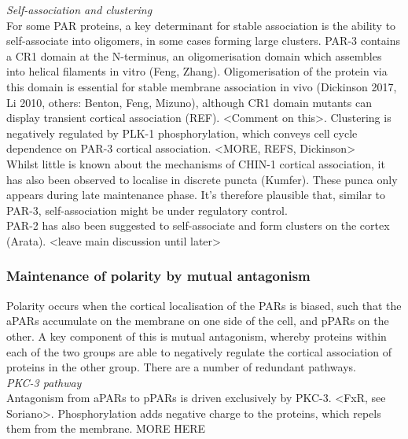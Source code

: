 \documentclass[12pt]{"article"}
\begin{document}
\textit{Self-association and clustering}\\

For some PAR proteins, a key determinant for stable association is the ability to self-associate into oligomers, in some cases forming large clusters. PAR-3 contains a CR1 domain at the N-terminus, an oligomerisation domain which assembles into helical filaments in vitro (Feng, Zhang). Oligomerisation of the protein via this domain is essential for stable membrane association in vivo (Dickinson 2017, Li 2010, others: Benton, Feng, Mizuno), although CR1 domain mutants can display transient cortical association (REF). <Comment on this>. Clustering is negatively regulated by PLK-1 phosphorylation, which conveys cell cycle dependence on PAR-3 cortical association. <MORE, REFS, Dickinson>\\

Whilst little is known about the mechanisms of CHIN-1 cortical association, it has also been observed to localise in discrete puncta (Kumfer). These punca only appears during late maintenance phase. It’s therefore plausible that, similar to PAR-3, self-association might be under regulatory control.\\

PAR-2 has also been suggested to self-associate and form clusters on the cortex (Arata). <leave main discussion until later>\\


\subsubsection{Maintenance of polarity by mutual antagonism}

Polarity occurs when the cortical localisation of the PARs is biased, such that the aPARs accumulate on the membrane on one side of the cell, and pPARs on the other. A key component of this is mutual antagonism, whereby proteins within each of the two groups are able to negatively regulate the cortical association of proteins in the other group. There are a number of redundant pathways.\\

\textit{PKC-3 pathway}\\ 

Antagonism from aPARs to pPARs is driven exclusively by PKC-3. <FxR, see Soriano>. Phosphorylation adds negative charge to the proteins, which repels them from the membrane. MORE HERE\\
\end{document}
